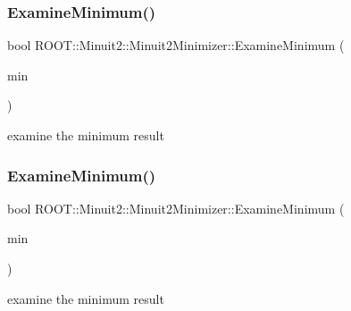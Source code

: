\subsubsection{\texorpdfstring{ExamineMinimum()}{ExamineMinimum()}\hspace{0.1cm}{\footnotesize\ttfamily [1/3]}}
{\footnotesize\ttfamily bool R\+O\+O\+T\+::\+Minuit2\+::\+Minuit2\+Minimizer\+::\+Examine\+Minimum (\begin{DoxyParamCaption}\item[{const \mbox{\hyperlink{classROOT_1_1Minuit2_1_1FunctionMinimum}{R\+O\+O\+T\+::\+Minuit2\+::\+Function\+Minimum}} \&}]{min }\end{DoxyParamCaption})\hspace{0.3cm}{\ttfamily [protected]}}



examine the minimum result 

\mbox{\label{classROOT_1_1Minuit2_1_1Minuit2Minimizer_a004057cf512dcbd986799fabe756cecc}} 
\subsubsection{\texorpdfstring{ExamineMinimum()}{ExamineMinimum()}\hspace{0.1cm}{\footnotesize\ttfamily [2/3]}}
{\footnotesize\ttfamily bool R\+O\+O\+T\+::\+Minuit2\+::\+Minuit2\+Minimizer\+::\+Examine\+Minimum (\begin{DoxyParamCaption}\item[{const \mbox{\hyperlink{classROOT_1_1Minuit2_1_1FunctionMinimum}{R\+O\+O\+T\+::\+Minuit2\+::\+Function\+Minimum}} \&}]{min }\end{DoxyParamCaption})\hspace{0.3cm}{\ttfamily [protected]}}



examine the minimum result 

\mbox{\label{classROOT_1_1Minuit2_1_1Minuit2Minimizer_a004057cf512dcbd986799fabe756cecc}} 
